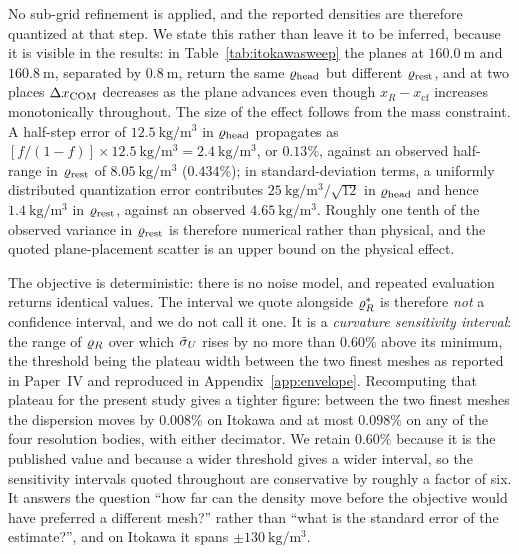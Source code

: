 No sub-grid refinement is applied, and the reported densities are
therefore quantized at that step. We state this rather than leave it to
be inferred, because it is visible in the results: in
Table~\ref{tab:itokawasweep} the planes at $\SI{160.0}{\metre}$ and
$\SI{160.8}{\metre}$, separated by $\SI{0.8}{\metre}$, return the same
$\varrho_{\mathrm{head}}$ but different $\varrho_{\mathrm{rest}}$, and at two places $\Delta x_{\mathrm{COM}}$
decreases as the plane advances even though $x_R - x_{\mathrm{cf}}$
increases monotonically throughout. The size of the effect follows from
the mass constraint. A half-step error of
$\SI{12.5}{\kilo\gram\per\cubic\metre}$ in $\varrho_{\mathrm{head}}$ propagates as
$[f/(1-f)]\times\SI{12.5}{\kilo\gram\per\cubic\metre}
= \SI{2.4}{\kilo\gram\per\cubic\metre}$, or $0.13\%$, against an observed
half-range in $\varrho_{\mathrm{rest}}$ of $\SI{8.05}{\kilo\gram\per\cubic\metre}$
($0.434\%$); in standard-deviation terms, a uniformly distributed
quantization error contributes
$\SI{25}{\kilo\gram\per\cubic\metre}/\!\sqrt{12}$ in $\varrho_{\mathrm{head}}$ and
hence $\SI{1.4}{\kilo\gram\per\cubic\metre}$ in $\varrho_{\mathrm{rest}}$, against an
observed $\SI{4.65}{\kilo\gram\per\cubic\metre}$. Roughly one tenth of
the observed variance in $\varrho_{\mathrm{rest}}$ is therefore numerical rather than
physical, and the quoted plane-placement scatter is an upper bound on the
physical effect.

The objective is deterministic: there is no noise model, and repeated
evaluation returns identical values. The interval we quote alongside
$\varrho_{R}^{\ast}$ is therefore \emph{not} a confidence interval, and we do
not call it one. It is a \emph{curvature sensitivity interval}: the range
of $\varrho_{R}$ over which $\tilde{\sigma}_{U}$ rises by no more than $0.60\%$ above
its minimum, the threshold being the plateau width between the two finest
meshes as reported in Paper~IV and reproduced in
Appendix~\ref{app:envelope}. Recomputing that plateau for the present study
gives a tighter figure: between the two finest meshes the dispersion moves by
$0.008\%$ on Itokawa and at most $0.098\%$ on any of the four resolution
bodies, with either decimator. We retain $0.60\%$ because it is the published
value and because a wider threshold gives a wider interval, so the sensitivity
intervals quoted throughout are conservative by roughly a factor of six.
It answers the question ``how far can the density move before the
objective would have preferred a different mesh?'' rather than ``what is
the standard error of the estimate?'', and on Itokawa it spans
$\pm\SI{130}{\kilo\gram\per\cubic\metre}$.

